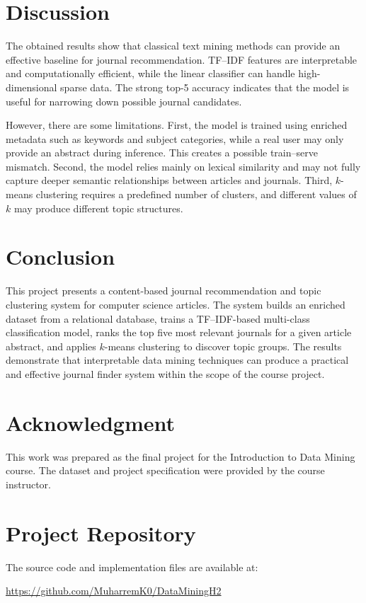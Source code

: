 \documentclass[conference]{IEEEtran}
\begin{document}
\section{Discussion}
The obtained results show that classical text mining methods can provide an effective baseline for journal recommendation. TF--IDF features are interpretable and computationally efficient, while the linear classifier can handle high-dimensional sparse data. The strong top-5 accuracy indicates that the model is useful for narrowing down possible journal candidates.

However, there are some limitations. First, the model is trained using enriched metadata such as keywords and subject categories, while a real user may only provide an abstract during inference. This creates a possible train--serve mismatch. Second, the model relies mainly on lexical similarity and may not fully capture deeper semantic relationships between articles and journals. Third, $k$-means clustering requires a predefined number of clusters, and different values of $k$ may produce different topic structures.

\section{Conclusion}
This project presents a content-based journal recommendation and topic clustering system for computer science articles. The system builds an enriched dataset from a relational database, trains a TF--IDF-based multi-class classification model, ranks the top five most relevant journals for a given article abstract, and applies $k$-means clustering to discover topic groups. The results demonstrate that interpretable data mining techniques can produce a practical and effective journal finder system within the scope of the course project.

\section*{Acknowledgment}
This work was prepared as the final project for the Introduction to Data Mining course. The dataset and project specification were provided by the course instructor.

\section*{Project Repository}
The source code and implementation files are available at:

\noindent \url{https://github.com/MuharremK0/DataMiningH2}
\end{document}
